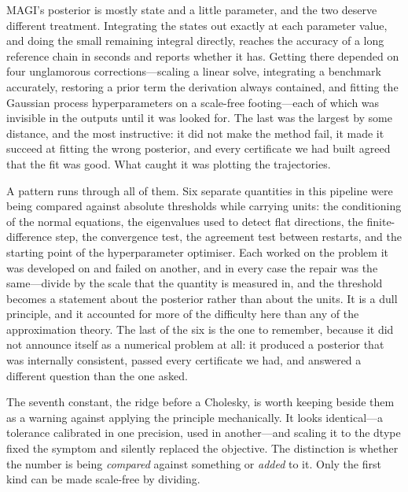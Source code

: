 \documentclass[11pt]{article}
\theoremstyle{plain}
\theoremstyle{definition}
\theoremstyle{remark}
\begin{document}
MAGI's posterior is mostly state and a little parameter, and the two deserve different treatment.
Integrating the states out exactly at each parameter value, and doing the small remaining integral
directly, reaches the accuracy of a long reference chain in seconds and reports whether it has.
Getting there depended on four unglamorous corrections---scaling a linear solve, integrating a
benchmark accurately, restoring a prior term the derivation always contained, and fitting the
Gaussian process hyperparameters on a scale-free footing---each of which was invisible in the
outputs until it was looked for. The last was the largest by some distance, and the most
instructive: it did not make the method fail, it made it succeed at fitting the wrong posterior,
and every certificate we had built agreed that the fit was good. What caught it was plotting the
trajectories.

A pattern runs through all of them. Six separate quantities in this pipeline were being compared
against absolute thresholds while carrying units: the conditioning of the normal equations, the
eigenvalues used to detect flat directions, the finite-difference step, the convergence test, the
agreement test between restarts, and the starting point of the hyperparameter optimiser. Each
worked on the problem it was developed on and failed on another, and in every case the repair was
the same---divide by the scale that the quantity is measured in, and the threshold becomes a
statement about the posterior rather than about the units. It is a dull principle, and it accounted
for more of the difficulty here than any of the approximation theory. The last of the six is the
one to remember, because it did not announce itself as a numerical problem at all: it produced a
posterior that was internally consistent, passed every certificate we had, and answered a different
question than the one asked.

The seventh constant, the ridge before a Cholesky, is worth keeping beside them as a warning
against applying the principle mechanically. It looks identical---a tolerance calibrated in one
precision, used in another---and scaling it to the dtype fixed the symptom and silently replaced
the objective. The distinction is whether the number is being \emph{compared} against something or
\emph{added} to it. Only the first kind can be made scale-free by dividing.
\end{document}
